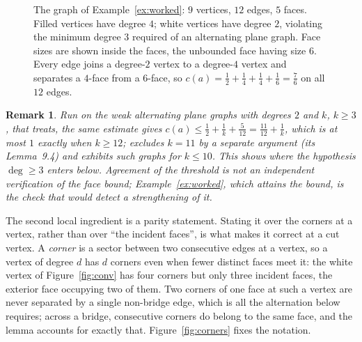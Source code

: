 \documentclass{baustms}
\theoremstyle{cupthm}
\theoremstyle{cupdefn}
\theoremstyle{cuprem}
\newtheorem{remark}[theorem]{Remark}
\begin{document}
\begin{figure}[ht]
\centering
{}
\caption{The graph of Example~\ref{ex:worked}: $9$ vertices, $12$ edges,
$5$ faces. Filled vertices have degree $4$; white vertices have degree $2$,
violating the minimum degree $3$ required of an alternating plane graph. Face
sizes are shown inside the faces, the unbounded face having size $6$. Every edge
joins a degree-$2$ vertex to a degree-$4$ vertex and separates a $4$-face from a
$6$-face, so $c(a) = \tfrac12+\tfrac14+\tfrac14+\tfrac16 = \tfrac76$ on all
$12$ edges.}\label{fig:worked}
\end{figure}

\begin{remark}\label{rem:calibration}
Run on the weak alternating plane graphs with degrees $2$ and $k$, $k \ge 3$,
that \cite{AHSSV2015} treats, the same estimate gives
$c(a) \le \tfrac12+\tfrac1k+\tfrac5{12} = \tfrac{11}{12}+\tfrac1k$, which is at
most $1$ exactly when $k \ge 12$; \cite{AHSSV2015} excludes $k = 11$ by a
separate argument (its Lemma~9.4) and exhibits such graphs for $k \le 10$. This
shows where the hypothesis $\deg \ge 3$ enters below. Agreement of the threshold
is not an independent verification of the face bound; Example~\ref{ex:worked},
which attains the bound, is the check that would detect a strengthening of it.
\end{remark}

The second local ingredient is a parity statement. Stating it over the corners at
a vertex, rather than over ``the incident faces'', is what makes it correct at a
cut vertex. A \emph{corner} is a sector between two consecutive edges at a
vertex, so a vertex of degree $d$ has $d$ corners even when fewer distinct faces
meet it: the white vertex of Figure~\ref{fig:conv} has four corners but only
three incident faces, the exterior face occupying two of them. Two corners of
one face at such a vertex are never separated by a single non-bridge edge, which
is all the alternation below requires; across a bridge, consecutive corners do
belong to the same face, and the lemma accounts for exactly that.
Figure~\ref{fig:corners} fixes the notation.
\end{document}
